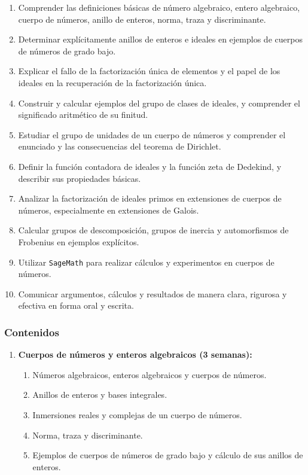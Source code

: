 \begin{refsection}
\begin{enumerate}
\item Comprender las definiciones básicas de número algebraico, entero algebraico, cuerpo de números, anillo de enteros, norma, traza y discriminante.
\item Determinar explícitamente anillos de enteros e ideales en ejemplos de cuerpos de números de grado bajo.
\item Explicar el fallo de la factorización única de elementos y el papel de los ideales en la recuperación de la factorización única.
\item Construir y calcular ejemplos del grupo de clases de ideales, y comprender el significado aritmético de su finitud.
\item Estudiar el grupo de unidades de un cuerpo de números y comprender el enunciado y las consecuencias del teorema de Dirichlet.
\item Definir la función contadora de ideales y la función zeta de Dedekind, y describir sus propiedades básicas.
\item Analizar la factorización de ideales primos en extensiones de cuerpos de números, especialmente en extensiones de Galois.
\item Calcular grupos de descomposición, grupos de inercia y automorfismos de Frobenius en ejemplos explícitos.
\item Utilizar \texttt{SageMath} para realizar cálculos y experimentos en cuerpos de números.
\item Comunicar argumentos, cálculos y resultados de manera clara, rigurosa y efectiva en forma oral y escrita.
\end{enumerate}



\subsubsection*{Contenidos}

\begin{enumerate}

\item \textbf{Cuerpos de números y enteros algebraicos (3 semanas):}
\begin{enumerate}
\item Números algebraicos, enteros algebraicos y cuerpos de números.
\item Anillos de enteros y bases integrales.
\item Inmersiones reales y complejas de un cuerpo de números.
\item Norma, traza y discriminante.
\item Ejemplos de cuerpos de números de grado bajo y cálculo de sus anillos de enteros.
\end{enumerate}


\end{enumerate}
\end{refsection}
